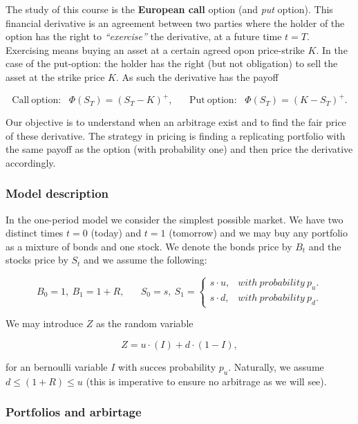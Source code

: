 \documentclass[a4paper,12pt,openany]{book}
\begin{document}
The study of this course is the \textbf{European call} option (and \emph{put} option). This financial derivative is an agreement between two parties where the holder of the option has the right to \emph{``exercise''} the derivative, at a future time \(t=T\). Exercising means buying an asset at a certain agreed opon price-strike \(K\). In the case of the put-option: the holder has the right (but not obligation) to sell the asset at the strike price \(K\). As such the derivative has the payoff

\[
\text{Call}\ \text{option:}\hspace{10pt}\Phi(S_T)=(S_T-K)^+,\hspace{20pt}\text{Put}\ \text{option:}\hspace{10pt}\Phi(S_T)=(K-S_T)^+.
\]

Our objective is to understand when an arbitrage exist and to find the fair price of these derivative. The strategy in pricing is finding a replicating portfolio with the same payoff as the option (with probability one) and then price the derivative accordingly.

\hypertarget{model-description}{%
\subsubsection{Model description}\label{model-description}}

In the one-period model we consider the simplest possible market. We have two distinct times \(t=0\) (today) and \(t=1\) (tomorrow) and we may buy any portfolio as a mixture of bonds and one stock. We denote the bonds price by \(B_t\) and the stocks price by \(S_t\) and we assume the following:

\[
B_0=1,\ B_1=1+R,\hspace{20pt}S_0=s,\ S_1=\left\{\begin{matrix}s\cdot u, & with\ probability\ p_u.\\s\cdot d, & with\ probability\ p_d.\end{matrix}\right.
\]

We may introduce \(Z\) as the random variable

\[
Z=u\cdot (I)+d\cdot (1-I),
\]

for an bernoulli variable \(I\) with succes probability \(p_u\). Naturally, we assume \(d\le (1+R)\le u\) (this is imperative to ensure no arbitrage as we will see).

\hypertarget{portfolios-and-arbirtage}{%
\subsubsection{Portfolios and arbirtage}\label{portfolios-and-arbirtage}}
\end{document}
